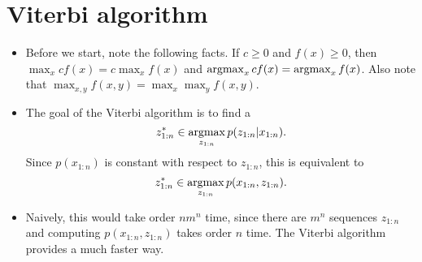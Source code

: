 \documentclass[12pt]{article}
\begin{document}
\section[Viterbi algorithm (for optimal sequence recovery)]{Viterbi algorithm}

\begin{itemize}
\item Before we start, note the following facts. If $c \geq 0$ and $f(x) \geq 0$, then $\max_x c f(x) = c \max_x f(x)$ and $\operatorname*{argmax}_x c f(x) = \operatorname*{argmax}_x f(x)$. Also note that $\max_{x,y} f(x,y) = \max_x \max_y f(x,y)$.
\item The goal of the Viterbi algorithm is to find a
$$ z_{1:n}^* \in \operatorname*{argmax}_{z_{1:n}} p(z_{1:n} | x_{1:n}). $$
Since $p(x_{1:n})$ is constant with respect to $z_{1:n}$, this is equivalent to
$$ z_{1:n}^* \in \operatorname*{argmax}_{z_{1:n}} p(x_{1:n},z_{1:n}). $$
\item Naively, this would take order $n m^n$ time, since there are $m^n$ sequences $z_{1:n}$ and computing $p(x_{1:n},z_{1:n})$ takes order $n$ time. The Viterbi algorithm provides a much faster way.
\end{itemize}
\end{document}
